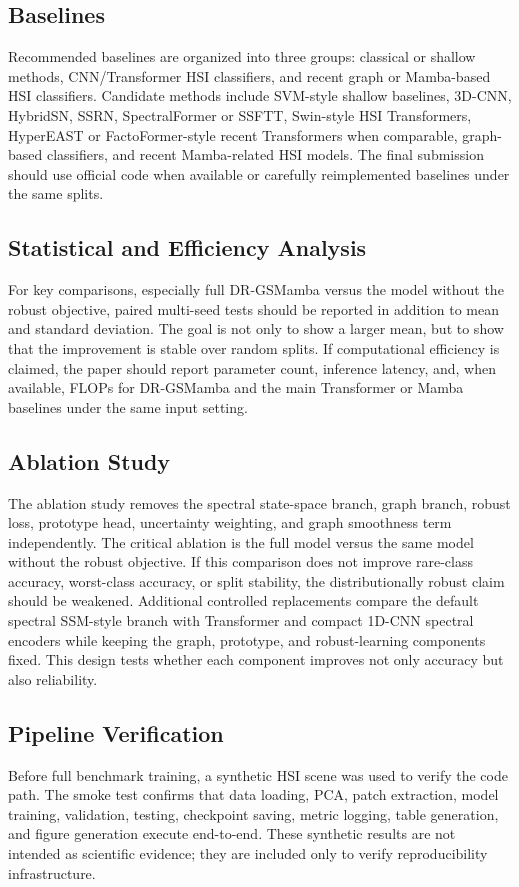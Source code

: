 \subsection{Baselines}
Recommended baselines are organized into three groups: classical or shallow methods, CNN/Transformer HSI classifiers, and recent graph or Mamba-based HSI classifiers. Candidate methods include SVM-style shallow baselines, 3D-CNN, HybridSN, SSRN, SpectralFormer or SSFTT, Swin-style HSI Transformers, HyperEAST or FactoFormer-style recent Transformers when comparable, graph-based classifiers, and recent Mamba-related HSI models. The final submission should use official code when available or carefully reimplemented baselines under the same splits.

\subsection{Statistical and Efficiency Analysis}
For key comparisons, especially full DR-GSMamba versus the model without the robust objective, paired multi-seed tests should be reported in addition to mean and standard deviation. The goal is not only to show a larger mean, but to show that the improvement is stable over random splits. If computational efficiency is claimed, the paper should report parameter count, inference latency, and, when available, FLOPs for DR-GSMamba and the main Transformer or Mamba baselines under the same input setting.

\subsection{Ablation Study}
The ablation study removes the spectral state-space branch, graph branch, robust loss, prototype head, uncertainty weighting, and graph smoothness term independently. The critical ablation is the full model versus the same model without the robust objective. If this comparison does not improve rare-class accuracy, worst-class accuracy, or split stability, the distributionally robust claim should be weakened. Additional controlled replacements compare the default spectral SSM-style branch with Transformer and compact 1D-CNN spectral encoders while keeping the graph, prototype, and robust-learning components fixed. This design tests whether each component improves not only accuracy but also reliability.

\subsection{Pipeline Verification}
Before full benchmark training, a synthetic HSI scene was used to verify the code path. The smoke test confirms that data loading, PCA, patch extraction, model training, validation, testing, checkpoint saving, metric logging, table generation, and figure generation execute end-to-end. These synthetic results are not intended as scientific evidence; they are included only to verify reproducibility infrastructure.

